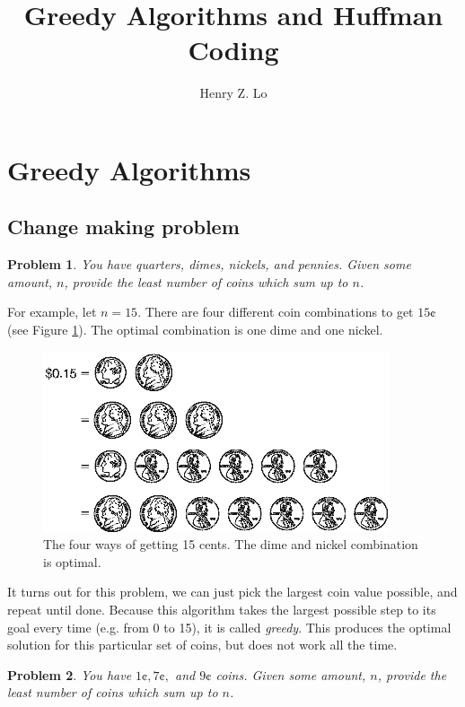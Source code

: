 \documentclass{article}
\newtheorem{problem}{Problem}
\begin{document}
\title{Greedy Algorithms and Huffman Coding}
\author{Henry Z. Lo}
\maketitle

\section{Greedy Algorithms}
\subsection{Change making problem}
\begin{problem}
You have quarters, dimes, nickels, and pennies.  Given some amount, $n$, provide the least number of coins which sum up to $n$.
\end{problem}

For example, let $n=15$.  There are four different coin combinations to get $15\cent$ (see Figure \ref{change}).  The optimal combination is one dime and one nickel.

\begin{figure}
\centering
\includegraphics[scale=0.6]{img/change.png}
\caption{The four ways of getting 15 cents.  The dime and nickel combination is optimal.  \label{change}}
\end{figure}

It turns out for this problem, we can just pick the largest coin value possible, and repeat until done.  Because this algorithm takes the largest possible step to its goal every time (e.g. from 0 to 15), it is called \textit{greedy}. This produces the optimal solution for this particular set of coins, but does not work all the time.

\begin{problem}
You have $1\cent, 7\cent,$ and $9\cent$ coins.  Given some amount, $n$, provide the least number of coins which sum up to $n$.
\end{problem}
\end{document}
